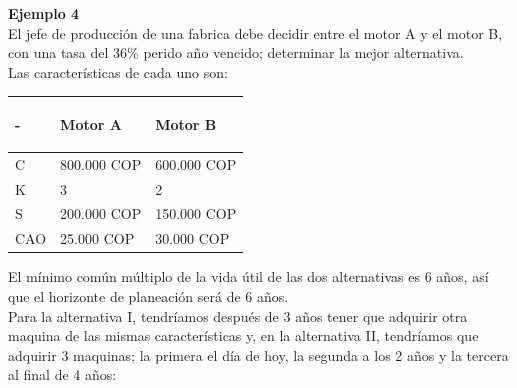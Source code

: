 \textbf{Ejemplo 4}\\
El jefe de producción de una fabrica debe decidir entre el motor A y el motor B, con una tasa del 36\% perido año vencido; determinar la mejor alternativa.\\

Las características de cada uno son:

\begin{center}
	\begin{tabular}{ |p{4cm}|p{4cm}| p{4cm}|}
		\hline
		\begin{center}\textbf{-} \end{center} & \begin{center} \textbf{Motor A}\end{center} & \begin{center} \textbf{Motor B} \end{center} \\ \hline
		C                          & 800.000 COP                 & 600.000 COP                  \\ \hline
		K                          & 3                          & 2                          		\\  \hline
		S                          & 200.000 COP                  & 150.000 COP                 \\ \hline
		CAO                        & 25.000 COP                   & 30.000 COP                   \\ \hline
	\end{tabular}
\end{center}
El mínimo común múltiplo de la vida útil de las dos alternativas es 6 años, así que el horizonte de planeación será de 6 años.\\
Para la alternativa I, tendríamos después de 3 años tener que adquirir otra maquina de las mismas características y, en la alternativa II, tendríamos que adquirir 3 maquinas; la primera el día de hoy, la segunda a los 2 años y la tercera al final de 4 años:
\\



